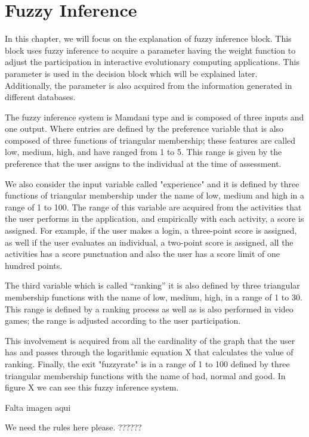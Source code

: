 \section{Fuzzy Inference}
In this chapter, we will focus on the explanation of fuzzy inference block. This block uses fuzzy inference to acquire a parameter having the weight function to adjust the participation in interactive evolutionary computing applications. This parameter is used in the decision block which will be explained later. Additionally, the parameter is also acquired from the information generated in different databases.

The fuzzy inference system is Mamdani type and is composed of three inputs and one output. Where entries are defined by the preference variable that is also composed of three functions of triangular membership; these features are called low, medium, high, and have ranged from 1 to 5. This range is given by the preference that the user assigns to the individual at the time of assessment.

We also consider the input variable called "experience" and it is defined by three functions of triangular membership under the name of low, medium and high in a range of 1 to 100. The range of this variable are acquired from the activities that the user performs in the application, and empirically with each activity, a score is assigned. For example, if the user makes a login, a three-point score is assigned, as well if the user evaluates an individual, a two-point score is assigned, all the activities has a score punctuation and also the user has a score limit of one hundred points.

The third variable which is called “ranking” it is also defined by three triangular membership functions with the name of low, medium, high, in a range of 1 to 30. This range is defined by a ranking process as well as is also performed in video games; the range is adjusted according to the user participation.

This involvement is acquired from all the cardinality of the graph that the user has and passes through the logarithmic equation X that calculates the value of ranking. Finally, the exit "fuzzyrate" is in a range of 1 to 100 defined by three triangular membership functions with the name of bad, normal and good. In figure X we can see this fuzzy inference system.

Falta imagen aqui

We need the rules here please. ??????


